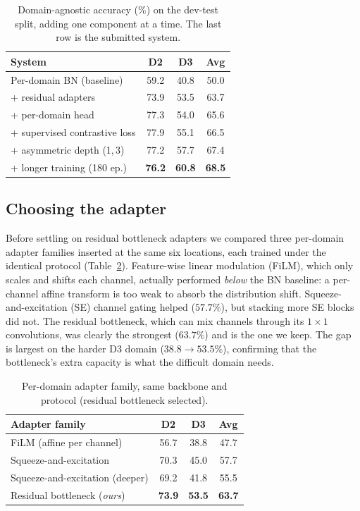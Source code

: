 \documentclass{article}
\begin{document}
\begin{sloppy}
\begin{table}[t]
  \centering
  \caption{Domain-agnostic accuracy ($\%$) on the dev-test split, adding one
           component at a time. The last row is the submitted system.}
  \label{tab:ablation}
  \begin{tabularx}{\columnwidth}{Xccc}
    \toprule
    System & D2 & D3 & Avg \\
    \midrule
    Per-domain BN (baseline) \cite{mulimani2025dil} & 59.2 & 40.8 & 50.0 \\
    \;+ residual adapters            & 73.9 & 53.5 & 63.7 \\
    \;+ per-domain head              & 77.3 & 54.0 & 65.6 \\
    \;+ supervised contrastive loss  & 77.9 & 55.1 & 66.5 \\
    \;+ asymmetric depth (1,\,3)     & 77.2 & 57.7 & 67.4 \\
    \;+ longer training (180 ep.)    & \textbf{76.2} & \textbf{60.8} & \textbf{68.5} \\
    \bottomrule
  \end{tabularx}
\end{table}

\subsection{Choosing the adapter}
\label{ssec:adapter_choice}

Before settling on residual bottleneck adapters we compared three per-domain
adapter families inserted at the same six locations, each trained under the
identical protocol (Table~\ref{tab:adapter}). Feature-wise linear modulation
(FiLM), which only scales and shifts each channel, actually performed
\emph{below} the BN baseline: a per-channel affine transform is too weak to
absorb the distribution shift. Squeeze-and-excitation (SE) channel gating
helped ($57.7\%$), but stacking more SE blocks did not. The residual
bottleneck, which can mix channels through its $1\times1$ convolutions, was
clearly the strongest ($63.7\%$) and is the one we keep. The gap is largest
on the harder D3 domain ($38.8\rightarrow53.5\%$), confirming that the
bottleneck's extra capacity is what the difficult domain needs.

\begin{table}[t]
  \centering
  \caption{Per-domain adapter family, same backbone and protocol
           (residual bottleneck selected).}
  \label{tab:adapter}
  \begin{tabularx}{\columnwidth}{Xccc}
    \toprule
    Adapter family & D2 & D3 & Avg \\
    \midrule
    FiLM (affine per channel)        & 56.7 & 38.8 & 47.7 \\
    Squeeze-and-excitation           & 70.3 & 45.0 & 57.7 \\
    Squeeze-and-excitation (deeper)  & 69.2 & 41.8 & 55.5 \\
    Residual bottleneck (\emph{ours}) & \textbf{73.9} & \textbf{53.5} & \textbf{63.7} \\
    \bottomrule
  \end{tabularx}
\end{table}


\end{sloppy}
\end{document}
